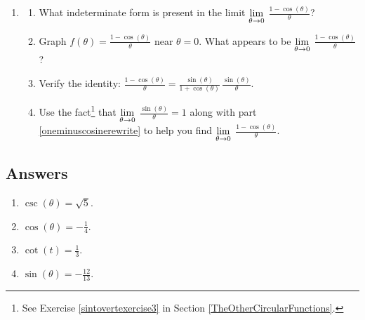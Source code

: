 \documentclass{ximera}
\begin{document}
\begin{enumerate}
\setcounter{enumi}{\value{HW}}

\item\label{oneminuscosinelimit}  \begin{enumerate}  \item What indeterminate form is present in the limit $\ds{\lim_{\theta \rightarrow 0}}$ $\frac{1 - \cos(\theta)}{\theta}$?

\item  Graph $f(\theta) = \frac{1 - \cos(\theta)}{\theta}$ near $\theta = 0$. What appears to be $\ds{\lim_{\theta \rightarrow 0}}$ $\frac{1 - \cos(\theta)}{\theta}$?


\item\label{oneminuscosinerewrite}  Verify the identity:  $\frac{1 - \cos(\theta)}{\theta} = \frac{\sin(\theta)}{1 + \cos(\theta)} \, \frac{\sin(\theta)}{\theta}$.

\item  Use the fact\footnote{See Exercise \ref{sintovertexercise3} in Section \ref{TheOtherCircularFunctions}.} that $\ds{\lim_{\theta \rightarrow 0}}$ $\frac{\sin(\theta)}{\theta} = 1$ along with  part \ref{oneminuscosinerewrite} to help you find $\ds{\lim_{\theta \rightarrow 0}}$ $\frac{1 - \cos(\theta)}{\theta}$.

\end{enumerate}

\setcounter{HW}{\value{enumi}}
\end{enumerate}

\newpage

\subsection{Answers}

\begin{multicols}{4}

\begin{enumerate}

\item   $\csc(\theta) = \sqrt{5}$. 

\item  $\cos(\theta) = -\frac{1}{4}$.  

\item   $\cot(t) = \frac{1}{3}$.  

\item $\sin(\theta) = -\frac{12}{13}$.  


\setcounter{HW}{\value{enumi}}

\end{enumerate}

\end{multicols}
\end{document}
